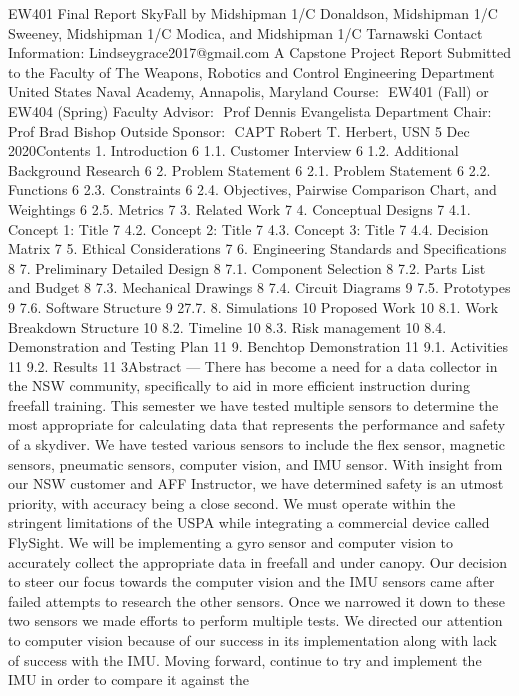 EW401 Final Report
SkyFall
by
Midshipman 1/C Donaldson, Midshipman 1/C Sweeney, Midshipman 1/C Modica, and Midshipman 1/C Tarnawski
Contact Information: Lindseygrace2017@gmail.com
A Capstone Project Report Submitted to the Faculty of
The Weapons, Robotics and Control Engineering Department
United States Naval Academy, Annapolis, Maryland
Course: ​ EW401 (Fall) or EW404 (Spring)
Faculty Advisor: ​ Prof Dennis Evangelista
Department Chair: ​ Prof Brad Bishop
Outside Sponsor: ​ CAPT Robert T. Herbert, USN
5 Dec 2020Contents
1.
Introduction
6
1.1. Customer Interview 6
1.2. Additional Background Research 6
2.
Problem Statement
6
2.1. Problem Statement 6
2.2. Functions 6
2.3. Constraints 6
2.4. Objectives, Pairwise Comparison Chart, and Weightings 6
2.5. Metrics 7
3. Related Work 7
4. Conceptual Designs 7
4.1. Concept 1: Title 7
4.2. Concept 2: Title 7
4.3. Concept 3: Title 7
4.4. Decision Matrix 7
5. Ethical Considerations 7
6. Engineering Standards and Specifications 8
7. Preliminary Detailed Design 8
7.1. Component Selection 8
7.2. Parts List and Budget 8
7.3. Mechanical Drawings 8
7.4. Circuit Diagrams 9
7.5. Prototypes 9
7.6. Software Structure 9
27.7.
8.
Simulations 10
Proposed Work 10
8.1. Work Breakdown Structure 10
8.2. Timeline 10
8.3. Risk management 10
8.4. Demonstration and Testing Plan 11
9.
Benchtop Demonstration
11
9.1. Activities 11
9.2. Results 11
3Abstract​ —
There has become a need for a data collector in the NSW community, specifically to aid in more efficient instruction
during freefall training. This semester we have tested multiple sensors to determine the most appropriate for calculating
data that represents the performance and safety of a skydiver. We have tested various sensors to include the flex
sensor, magnetic sensors, pneumatic sensors, computer vision, and IMU sensor. With insight from our NSW customer
and AFF Instructor, we have determined safety is an utmost priority, with accuracy being a close second. We must
operate within the stringent limitations of the USPA while integrating a commercial device called FlySight.
We will be implementing a gyro sensor and computer vision to accurately collect the appropriate data in freefall and
under canopy. Our decision to steer our focus towards the computer vision and the IMU sensors came after failed
attempts to research the other sensors. Once we narrowed it down to these two sensors we made efforts to perform
multiple tests. We directed our attention to computer vision because of our success in its implementation along with
lack of success with the IMU. Moving forward, continue to try and implement the IMU in order to compare it against the
